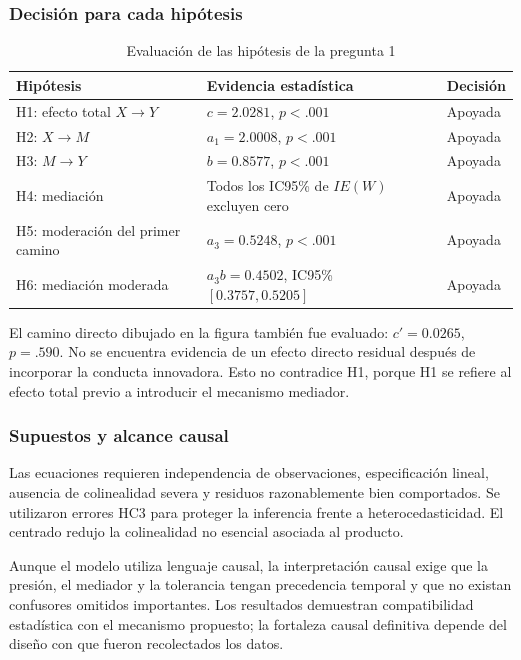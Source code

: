 \documentclass[11pt,letterpaper]{article}
\begin{document}
\subsubsection*{Decisión para cada hipótesis}

\begin{table}[H]
\centering
\caption{Evaluación de las hipótesis de la pregunta 1}
\begin{tabularx}{\textwidth}{lXl}
\toprule
Hipótesis & Evidencia estadística & Decisión\\
\midrule
H1: efecto total $X\rightarrow Y$ & $c=2.0281$, $p<.001$ & Apoyada\\
H2: $X\rightarrow M$ & $a_1=2.0008$, $p<.001$ & Apoyada\\
H3: $M\rightarrow Y$ & $b=0.8577$, $p<.001$ & Apoyada\\
H4: mediación & Todos los IC95\% de $IE(W)$ excluyen cero & Apoyada\\
H5: moderación del primer camino & $a_3=0.5248$, $p<.001$ & Apoyada\\
H6: mediación moderada & $a_3b=0.4502$, IC95\% $[0.3757,0.5205]$ & Apoyada\\
\bottomrule
\end{tabularx}
\end{table}

El camino directo dibujado en la figura también fue evaluado: $c'=0.0265$, $p=.590$. No se encuentra evidencia de un efecto directo residual después de incorporar la conducta innovadora. Esto no contradice H1, porque H1 se refiere al efecto total previo a introducir el mecanismo mediador.

\subsubsection*{Supuestos y alcance causal}

Las ecuaciones requieren independencia de observaciones, especificación lineal, ausencia de colinealidad severa y residuos razonablemente bien comportados. Se utilizaron errores HC3 para proteger la inferencia frente a heterocedasticidad. El centrado redujo la colinealidad no esencial asociada al producto.

Aunque el modelo utiliza lenguaje causal, la interpretación causal exige que la presión, el mediador y la tolerancia tengan precedencia temporal y que no existan confusores omitidos importantes. Los resultados demuestran compatibilidad estadística con el mecanismo propuesto; la fortaleza causal definitiva depende del diseño con que fueron recolectados los datos.
\end{document}
